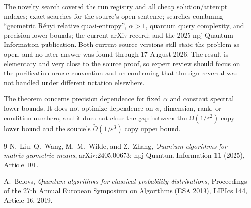 \documentclass[10pt]{article}
\newcommand{\eps}{\varepsilon}
\begin{document}
The novelty search covered the run registry and all cheap solution/attempt
indexes; exact searches for the source's open sentence; searches combining
``geometric Rényi relative quasi-entropy'', $\alpha>1$, quantum query
complexity, and precision lower bounds; the current arXiv record; and the 2025
npj Quantum Information publication.  Both current source versions still
state the problem as open, and no later answer was found through 17 August
2026.  The result is elementary and very close to the source proof, so expert
review should focus on the purification-oracle convention and on confirming
that the sign reversal was not handled under different notation elsewhere.

The theorem concerns precision dependence for fixed $\alpha$ and constant
spectral lower bounds.  It does not optimize dependence on $\alpha$, dimension,
rank, or condition numbers, and it does not close the gap between the
$\Omega(1/\eps^2)$ copy lower bound and the source's
$\widetilde O(1/\eps^3)$ copy upper bound.

\begin{thebibliography}{9}
N.~Liu, Q.~Wang, M.~M.~Wilde, and Z.~Zhang,
\emph{Quantum algorithms for matrix geometric means}, arXiv:2405.00673;
npj Quantum Information \textbf{11} (2025), Article 101.

A.~Belovs,
\emph{Quantum algorithms for classical probability distributions},
Proceedings of the 27th Annual European Symposium on Algorithms (ESA 2019),
LIPIcs 144, Article 16, 2019.
\end{thebibliography}
\end{document}
